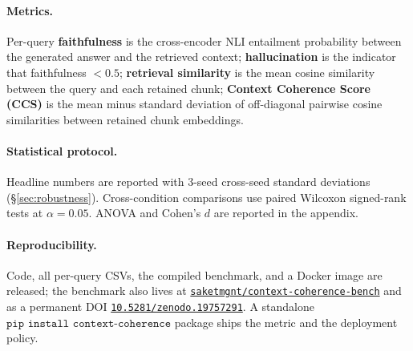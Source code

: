 \paragraph{Metrics.}
Per-query \textbf{faithfulness} is the cross-encoder NLI entailment
probability between the generated answer and the retrieved context;
\textbf{hallucination} is the indicator that faithfulness $<0.5$;
\textbf{retrieval similarity} is the mean cosine similarity between
the query and each retained chunk; \textbf{Context Coherence Score
(CCS)} is the mean minus standard deviation of off-diagonal
pairwise cosine similarities between retained chunk embeddings.

\paragraph{Statistical protocol.}
Headline numbers are reported with $3$-seed cross-seed standard
deviations (\S\ref{sec:robustness}). Cross-condition comparisons use
paired Wilcoxon signed-rank tests at $\alpha=0.05$. ANOVA and
Cohen's $d$ are reported in the appendix.

\paragraph{Reproducibility.}
Code, all per-query CSVs, the compiled benchmark, and a Docker image
are released; the benchmark also lives at
\href{https://huggingface.co/datasets/saketmgnt/context-coherence-bench}
{\texttt{saketmgnt/context-coherence-bench}} and as a permanent DOI
\href{https://doi.org/10.5281/zenodo.19757291}{\texttt{10.5281/zenodo.19757291}}.
A standalone $\texttt{pip install context-coherence}$ package ships
the metric and the deployment policy.

